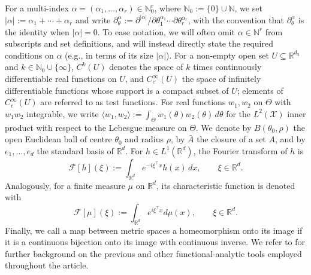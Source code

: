 \documentclass[11pt,twoside]{article} %
\begin{document}
For a multi-index $\alpha=(\alpha_1,\ldots,\alpha_{r})\in\mathbb N_0^{r}$, where $\mathbb N_0:=\{0\}\cup\mathbb N$, we set $|\alpha|:=\alpha_1+\cdots+\alpha_{r}$ and write $\partial^\alpha_\theta:=\partial^{|\alpha|}/\partial\theta_1^{\alpha_1}\cdots\partial\theta_{r}^{\alpha_{r}}$, with the convention that $\partial^\alpha_\theta$ is the identity when $|\alpha|=0$. To ease notation, we will often omit $\alpha \in \mathbb N^{r}$ from subscripts and set definitions, and will instead directly state the required conditions on $\alpha$ (e.g., in terms of its size $|\alpha|$). For a non-empty open set $U\subseteq\mathbb R^{d_2}$ and $k\in\mathbb N_0\cup\{\infty\}$, $C^k(U)$ denotes the space of $k$ times continuously differentiable real functions on $U$, and $C_c^\infty(U)$ the space of infinitely differentiable functions whose support is a compact subset of $U$; elements of $C_c^\infty(U)$ are referred to as test functions. For real functions $w_1,w_2$ on $\Theta$ with $w_1w_2$ integrable, we write $\langle w_1,w_2\rangle:=\int_\Theta w_1(\theta)w_2(\theta)\,d\theta$ for the $L^2(\mathcal X)$ inner product with respect to the Lebesgue measure on $\Theta$. We denote by $B(\theta_0,\rho)$ the open Euclidean ball of centre $\theta_0$ and radius $\rho$, by $\bar A$ the closure of a set $A$, and by $e_1,\ldots,e_{d}$ the standard basis of $\mathbb R^{d}$. For $h\in L^1(\mathbb R^{d})$, the Fourier transform of $h$ is
\begin{equation*}
    \mathcal F[h](\xi):=\int_{\mathbb R^{d}}e^{-i\xi^\top x}h(x)\,dx,\qquad \xi\in\mathbb R^{d}.
\end{equation*}
Analogously, for a finite measure $\mu$ on $\mathbb{R}^d$, its characteristic function is denoted with
\[
 \mathcal F[\mu](\xi):=\int_{\mathbb R^{d}}e^{ i\xi^\top x}d\mu(x),\qquad \xi\in\mathbb R^{d}.
\]
Finally, we call a map between metric spaces a homeomorphism onto its image if it is a continuous bijection onto its image with continuous inverse. We refer to \cite{folland1999real} for further background on the previous and other functional-analytic tools employed throughout the article.
\end{document}

